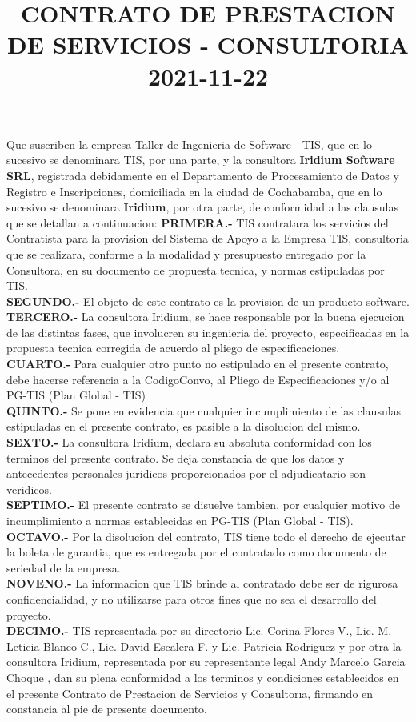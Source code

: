 \documentclass[10pt,letterpaper]{article}
\title{ \textbf{CONTRATO DE PRESTACION DE SERVICIOS - CONSULTORIA }\\2021-11-22}\date{}
\begin{document}
\maketitle


Que suscriben la empresa Taller de Ingenieria de Software - TIS, que en lo sucesivo se denominara TIS, por
una parte, y la consultora \textbf{Iridium Software SRL}, registrada debidamente en el Departamento de Procesamiento de Datos y Registro e Inscripciones, domiciliada en la ciudad de Cochabamba, que en lo sucesivo se
denominara \textbf{Iridium}, por otra parte, de conformidad a las clausulas que se detallan a continuacion:
\textbf{PRIMERA.-} TIS contratara los servicios del Contratista para la provision del Sistema de Apoyo a la Empresa
TIS, consultoria que se realizara, conforme a la modalidad y presupuesto entregado por la Consultora, en su
documento de propuesta tecnica, y normas estipuladas por TIS.\\
\textbf{SEGUNDO.-} El objeto de este contrato es la provision de un producto software.\\
\textbf{TERCERO.-} La consultora Iridium, se hace responsable por la buena ejecucion de las distintas fases, que
involucren su ingenieria del proyecto, especificadas en la propuesta tecnica corregida de acuerdo al pliego de
especificaciones.\\
\textbf{CUARTO.-} Para cualquier otro punto no estipulado en el presente contrato, debe hacerse referencia a la
{CodigoConvo}, al Pliego de Especificaciones y/o al PG-TIS (Plan Global - TIS)\\
\textbf{QUINTO.-} Se pone en evidencia que cualquier incumplimiento de las clausulas estipuladas en el presente
contrato, es pasible a la disolucion del mismo.\\
\textbf{SEXTO.-} La consultora Iridium, declara su absoluta conformidad con los terminos del presente contrato.
Se deja constancia de que los datos y antecedentes personales juridicos proporcionados por el adjudicatario son
veridicos.\\
\textbf{SEPTIMO.-} El presente contrato se disuelve tambien, por cualquier motivo de incumplimiento a normas establecidas en PG-TIS (Plan Global - TIS).\\
\textbf{OCTAVO.-} Por la disolucion del contrato, TIS tiene todo el derecho de ejecutar la boleta de garantia, que es
entregada por el contratado como documento de seriedad de la empresa.\\
\textbf{NOVENO.-} La informacion que TIS brinde al contratado debe ser de rigurosa confidencialidad, y no utilizarse
para otros fines que no sea el desarrollo del proyecto.\\
\textbf{DECIMO.-} TIS representada por su directorio Lic. Corina Flores V., Lic. M. Leticia Blanco C., Lic. David
Escalera F. y Lic. Patricia Rodriguez y por otra la consultora Iridium, representada por su representante
legal Andy Marcelo Garcia Choque , dan su plena conformidad a los terminos y condiciones establecidos en el
presente Contrato de Prestacion de Servicios y Consultorıa, firmando en constancia al pie de presente documento.\\
\end{document}
